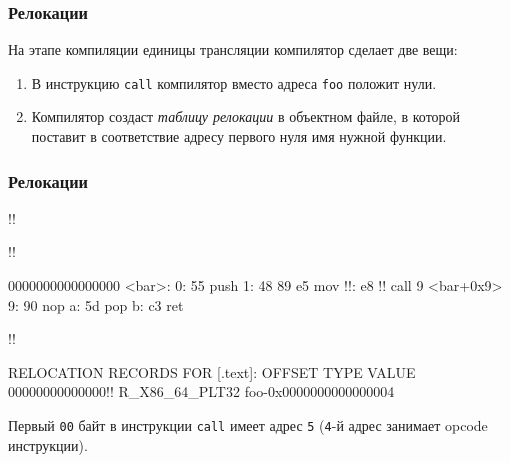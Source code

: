 \documentclass[compress, 8pt, aspectratio=169]{beamer}
\begin{document}

\begin{frame}

    \frametitle{Релокации}

    На этапе компиляции единицы трансляции компилятор сделает
    две вещи:

    \begin{enumerate}

        \item В инструкцию \texttt{call} компилятор вместо адреса
            \texttt{foo} положит нули.

        \item Компилятор создаст \textit{таблицу релокации}
            в объектном файле, в которой поставит в соответствие
            адресу первого нуля имя нужной функции.

    \end{enumerate}

\end{frame}


\begin{frame}[fragile]

    \frametitle{Релокации}

            \begin{terminalwindow}
!!

!!

0000000000000000 <bar>:
   0:   55                      push   %
   1:   48 89 e5                mov    %
   !!:   e8 !!          call   9 <bar+0x9>
   9:   90                      nop
   a:   5d                      pop    %
   b:   c3                      ret

!!

RELOCATION RECORDS FOR [.text]:
OFFSET           TYPE              VALUE
00000000000000!! R_X86_64_PLT32    foo-0x0000000000000004
            \end{terminalwindow}

    \bigbreak

    Первый \texttt{00} байт в инструкции \texttt{call} имеет адрес
    \texttt{5} (\texttt{4}-й адрес занимает opcode инструкции).

\end{frame}
\end{document}
